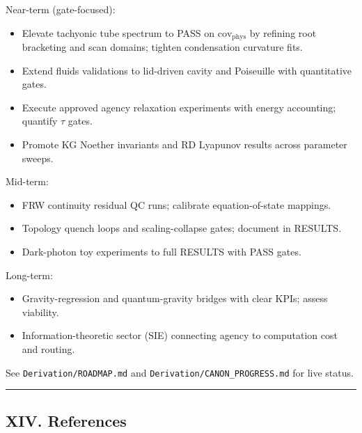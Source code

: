\documentclass[
]{article}
\providecommand{\tightlist}{%
  \setlength{\itemsep}{0pt}\setlength{\parskip}{0pt}}
\begin{document}
Near-term (gate-focused):

\begin{itemize}
\tightlist
\item
  Elevate tachyonic tube spectrum to PASS on
  \(\mathrm{cov}_{\mathrm{phys}}\) by refining root bracketing and scan
  domains; tighten condensation curvature fits.
\item
  Extend fluids validations to lid-driven cavity and Poiseuille with
  quantitative gates.
\item
  Execute approved agency relaxation experiments with energy accounting;
  quantify \(\tau\) gates.
\item
  Promote KG Noether invariants and RD Lyapunov results across parameter
  sweeps.
\end{itemize}

Mid-term:

\begin{itemize}
\tightlist
\item
  FRW continuity residual QC runs; calibrate equation-of-state mappings.
\item
  Topology quench loops and scaling-collapse gates; document in RESULTS.
\item
  Dark-photon toy experiments to full RESULTS with PASS gates.
\end{itemize}

Long-term:

\begin{itemize}
\tightlist
\item
  Gravity-regression and quantum-gravity bridges with clear KPIs; assess
  viability.
\item
  Information-theoretic sector (SIE) connecting agency to computation
  cost and routing.
\end{itemize}

See \texttt{Derivation/ROADMAP.md} and
\texttt{Derivation/CANON\_PROGRESS.md} for live status.

\begin{center}\rule{0.5\linewidth}{0.5pt}\end{center}

\hypertarget{xiv.-references}{%
\subsection{XIV. References}\label{xiv.-references}}
\end{document}
